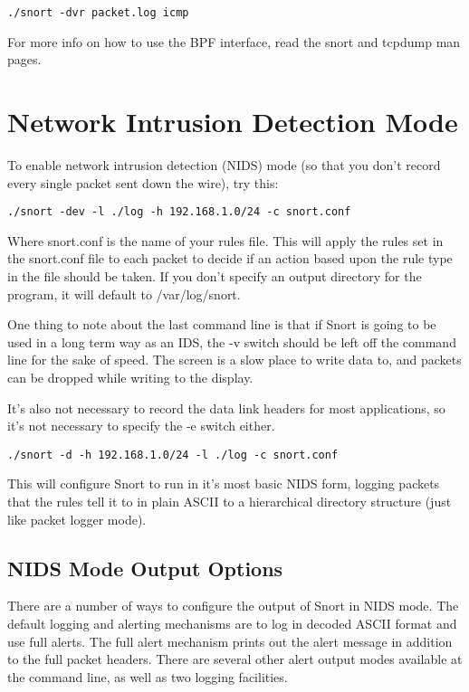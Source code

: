 \documentclass[english]{report}
\begin{document}
\begin{verbatim}
./snort -dvr packet.log icmp 
\end{verbatim}
For more info on how to use the BPF interface, read the snort and
tcpdump man pages.

\section{Network Intrusion Detection Mode}

To enable network intrusion detection (NIDS) mode (so that you don't
record every single packet sent down the wire), try this:

\begin{verbatim}
./snort -dev -l ./log -h 192.168.1.0/24 -c snort.conf
\end{verbatim}
Where snort.conf is the name of your rules file. This will apply the
rules set in the snort.conf file to each packet to decide if an action
based upon the rule type in the file should be taken. If you don't
specify an output directory for the program, it will default to /var/log/snort.

One thing to note about the last command line is that if Snort is
going to be used in a long term way as an IDS, the -v
switch should be left off the command line for the sake of speed.
The screen is a slow place to write data to, and packets can be dropped
while writing to the display.

It's also not necessary to record the data link headers for most applications,
so it's not necessary to specify the -e switch either.

\begin{verbatim}
./snort -d -h 192.168.1.0/24 -l ./log -c snort.conf
\end{verbatim}
This will configure Snort to run in it's most basic NIDS form, logging
packets that the rules tell it to in plain ASCII to a hierarchical
directory structure (just like packet logger mode). 


\subsection{NIDS Mode Output Options}

There are a number of ways to configure the output of Snort in NIDS
mode. The default logging and alerting mechanisms are to log in decoded
ASCII format and use full alerts. The full alert
mechanism prints out the alert message in addition to the full packet
headers. There are several other alert output modes available at the
command line, as well as two logging facilities.
\end{document}
